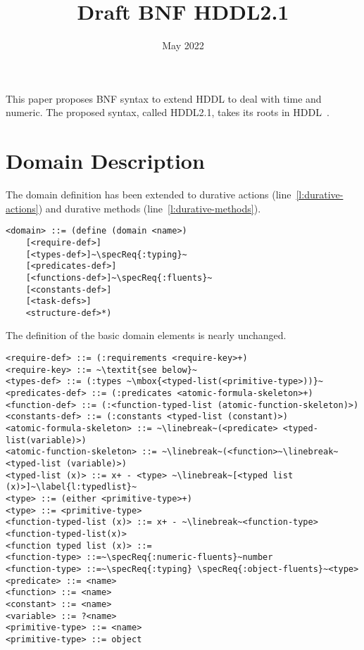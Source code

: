 \documentclass{article}
\title{Draft BNF HDDL2.1}
\date{May 2022}
\begin{document}
\maketitle

This paper proposes BNF syntax to extend HDDL to deal with time and numeric. The proposed syntax, called HDDL2.1, takes its roots in HDDL~\citep{holler:19}. 
\section{Domain Description}

\newcommand{\specReq}[1]{\ensuremath{\mathtt{^{#1}}}}

The domain definition has been extended to durative actions (line~\ref{l:durative-actions}) and durative methods (line~\ref{l:durative-methods}).
\begin{lstlisting}[escapechar=~]
<domain> ::= (define (domain <name>)
    [<require-def>]
    [<types-def>]~\specReq{:typing}~
    [<predicates-def>]
    [<functions-def>]~\specReq{:fluents}~
    [<constants-def>]
    [<task-defs>]
    <structure-def>*)
\end{lstlisting}

%
%
%

\noindent The definition of the basic domain elements is nearly unchanged.

\begin{lstlisting}[firstnumber=last, escapechar=~]
<require-def> ::= (:requirements <require-key>+)
<require-key> ::= ~\textit{see below}~
<types-def> ::= (:types ~\mbox{<typed-list(<primitive-type>))}~
<predicates-def> ::= (:predicates <atomic-formula-skeleton>+)
<function-def> ::= (:<function-typed-list (atomic-function-skeleton)>)
<constants-def> ::= (:constants <typed-list (constant)>)
<atomic-formula-skeleton> ::= ~\linebreak~(<predicate> <typed-list(variable)>)
<atomic-function-skeleton> ::= ~\linebreak~(<function>~\linebreak~ <typed-list (variable)>)
<typed-list (x)> ::= x+ - <type> ~\linebreak~[<typed list (x)>]~\label{l:typedlist}~
<type> ::= (either <primitive-type>+)
<type> ::= <primitive-type>
<function-typed-list (x)> ::= x+ - ~\linebreak~<function-type> <function-typed-list(x)>
<function typed list (x)> ::=
<function-type> ::=~\specReq{:numeric-fluents}~number
<function-type> ::=~\specReq{:typing} \specReq{:object-fluents}~<type>
<predicate> ::= <name>
<function> ::= <name>
<constant> ::= <name>
<variable> ::= ?<name>
<primitive-type> ::= <name>
<primitive-type> ::= object
\end{lstlisting}
\end{document}
